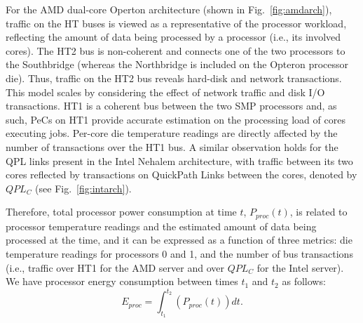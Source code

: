 \documentclass[prodmode,acmtaco,pdftex]{acmsmall}
\newcommand{\figurename}{Fig.}
\begin{document}
For the AMD dual-core Operton architecture (shown in
\figurename~\ref{fig:amdarch}), traffic on the HT buses is viewed as a
representative of the processor workload, reflecting the amount of data
being processed by a processor (i.e., its involved cores).  The HT2 bus
is non-coherent and connects one of the two processors to the
Southbridge (whereas the Northbridge is included on the Opteron
processor die).  Thus, traffic on the HT2 bus reveals hard-disk and
network transactions.  This model scales by considering the effect of
network traffic and disk I/O transactions.  HT1 is a coherent bus
between the two SMP processors and, as such, PeCs on HT1 provide
accurate estimation on the processing load of cores executing jobs.
Per-core die temperature readings are directly affected by the number of
transactions over the HT1 bus.  A similar observation holds for the QPL
links present in the Intel Nehalem architecture, with traffic between
its two cores reflected by transactions on QuickPath Links between the
cores, denoted by $QPL_C$ (see \figurename~\ref{fig:intarch}).

Therefore, total processor power consumption at time $t$, $P_{proc}(t)$,
is related to processor temperature readings and the estimated amount of
data being processed at the time, and it can be expressed as a function
of three metrics: die temperature readings for processors 0 and 1, and
the number of bus transactions (i.e., traffic over HT1 for the AMD
server and over $QPL_C$ for the Intel server).  We have processor energy
consumption between times $t_{1}$ and $t_{2}$ as follows:
\begin{equation}
  \label{eq:procpwr2}
  E_{proc}=\displaystyle\int_{t_{1}}^{t_{2}}\left( {P_{proc}(t)} \right)dt.
\end{equation}
\end{document}
